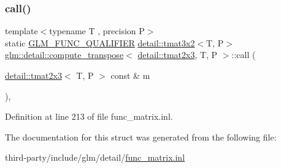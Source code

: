 \subsubsection{\texorpdfstring{call()}{call()}}
{\footnotesize\ttfamily template$<$typename T , precision P$>$ \\
static \hyperlink{setup_8hpp_a33fdea6f91c5f834105f7415e2a64407}{G\+L\+M\+\_\+\+F\+U\+N\+C\+\_\+\+Q\+U\+A\+L\+I\+F\+I\+ER} \hyperlink{structglm_1_1detail_1_1tmat3x2}{detail\+::tmat3x2}$<$T, P$>$ \hyperlink{structglm_1_1detail_1_1compute__transpose}{glm\+::detail\+::compute\+\_\+transpose}$<$ \hyperlink{structglm_1_1detail_1_1tmat2x3}{detail\+::tmat2x3}, T, P $>$\+::call (\begin{DoxyParamCaption}\item[{\hyperlink{structglm_1_1detail_1_1tmat2x3}{detail\+::tmat2x3}$<$ T, P $>$ const \&}]{m }\end{DoxyParamCaption})\hspace{0.3cm}{\ttfamily [inline]}, {\ttfamily [static]}}



Definition at line 213 of file func\+\_\+matrix.\+inl.



The documentation for this struct was generated from the following file\+:\begin{DoxyCompactItemize}
\item 
third-\/party/include/glm/detail/\hyperlink{func__matrix_8inl}{func\+\_\+matrix.\+inl}\end{DoxyCompactItemize}
